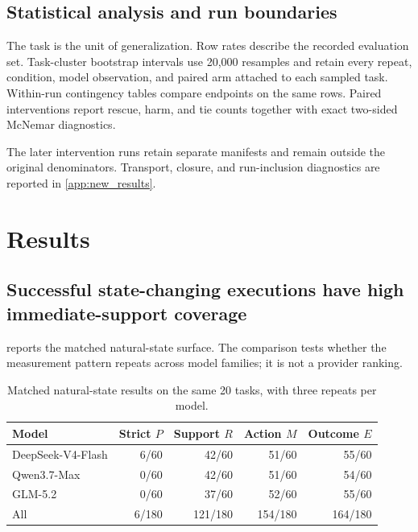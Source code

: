 \documentclass[11pt]{article}
\newcommand{\Rsupport}{R}
\newcommand{\Pstrict}{P}
\newcommand{\Maction}{M}
\newcommand{\Eoutcome}{E}
\begin{document}
\subsection{Statistical analysis and run boundaries}

The task is the unit of generalization. Row rates describe the recorded evaluation set. Task-cluster bootstrap intervals use 20,000 resamples and retain every repeat, condition, model observation, and paired arm attached to each sampled task. Within-run contingency tables compare endpoints on the same rows. Paired interventions report rescue, harm, and tie counts together with exact two-sided McNemar diagnostics.

The later intervention runs retain separate manifests and remain outside the original denominators. Transport, closure, and run-inclusion diagnostics are reported in \cref{app:new_results}.

\section{Results}
\label{sec:results}

\subsection{Successful state-changing executions have high immediate-support coverage}
\label{sec:coverage}

 reports the matched natural-state surface. The comparison tests whether the measurement pattern repeats across model families; it is not a provider ranking.

\begin{table}[t]
\centering
\caption{Matched natural-state results on the same 20 tasks, with three repeats per model.}
\label{tab:matched}
\small
\begin{tabular}{@{}lrrrr@{}}
\toprule
Model & Strict \(\Pstrict\) & Support \(\Rsupport\) & Action \(\Maction\) & Outcome \(\Eoutcome\) \\
\midrule
DeepSeek-V4-Flash & 6/60 & 42/60 & 51/60 & 55/60 \\
Qwen3.7-Max & 0/60 & 42/60 & 51/60 & 54/60 \\
GLM-5.2 & 0/60 & 37/60 & 52/60 & 55/60 \\
\midrule
All & 6/180 & 121/180 & 154/180 & 164/180 \\
\bottomrule
\end{tabular}
\end{table}
\end{document}
